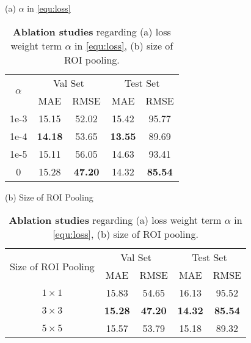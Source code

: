\documentclass[10pt,twocolumn,letterpaper]{article}
\begin{document}
\begin{table}[t]
    \caption{\textbf{Ablation studies} regarding (a) loss weight term $\alpha$ in \cref{equ:loss}, (b) size of ROI pooling.}
    \vspace{5pt}
    \label{appendix:tab:ablation}
    \centering
    \scriptsize
    (a) $\alpha$ in \cref{equ:loss} \\
    \begin{minipage}[t]{0.5\textwidth}
        \centering
        \setlength\tabcolsep{8pt}
        \begin{tabular}{ccccc}
            \toprule
            \multirow{2}{*}{$\alpha$} 
            & \multicolumn{2}{c}{Val Set} & \multicolumn{2}{c}{Test Set} \\
            \cmidrule{2-5}
            & MAE & RMSE & MAE & RMSE \\
            \midrule
            1e-3 & 15.15 & 52.02 & 15.42 & 95.77 \\
            1e-4 & \textbf{14.18} & 53.65 & \textbf{13.55} & 89.69 \\
            1e-5 & 15.11 & 56.05 & 14.63 & 93.41 \\
            0    & 15.28 & \textbf{47.20} & 14.32 & \textbf{85.54} \\
            \bottomrule
        \end{tabular}
    \end{minipage}
    \vfill
    \vspace{5pt}
    (b) Size of ROI Pooling \\
    \begin{minipage}[t]{0.5\textwidth}
        \centering
        \setlength\tabcolsep{6pt}
        \begin{tabular}{ccccc}
            \toprule
            \multirow{2}{*}{Size of ROI Pooling} 
            & \multicolumn{2}{c}{Val Set} & \multicolumn{2}{c}{Test Set} \\
            \cmidrule{2-5}
            & MAE & RMSE & MAE & RMSE \\
            \midrule
            $1 \times 1$ & 15.83 & 54.65  & 16.13 & 95.52 \\
            $3 \times 3$ & \textbf{15.28} & \textbf{47.20} & \textbf{14.32} & \textbf{85.54} \\
            $5 \times 5$ & 15.57 & 53.79 & 15.18 & 89.32 \\
            \bottomrule
        \end{tabular}
    \end{minipage}
\end{table}
\end{document}
